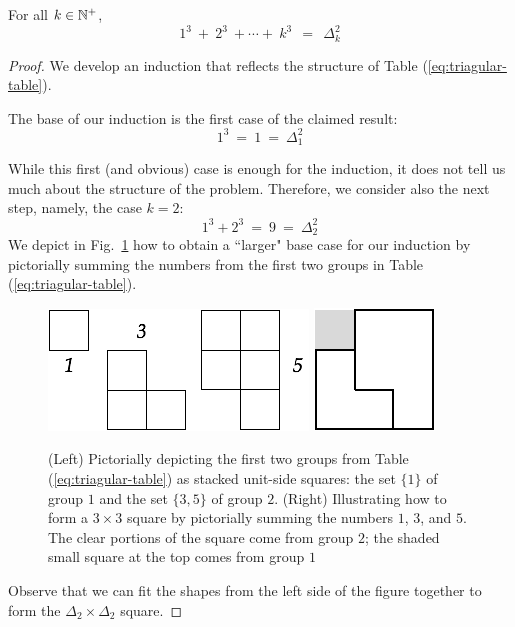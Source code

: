 \begin{prop}
\label{thm:cubes-sumto-Delta-saquared}
For all $k \in \mathbb{N}^+$,
\[ 1^3 \ + \ 2^3 \ + \cdots + \ k^3 \ \ = \ \ \Delta_k^2 \]
\end{prop}

\begin{proof}
We develop an induction that reflects the structure of Table (\ref{eq:triagular-table}).

\smallskip

The base of our induction is the first case of the claimed result:
\[  1^3 \  = \ 1 \ = \ \Delta_1^2 \]

While this first (and obvious) case is enough for the induction, it does not tell us much about the structure of the problem.  Therefore, we consider also the next step, namely, the case $k=2$:
\[  1^3 + 2^3 \ = \ 9 \ = \ \Delta_2^2 \]
We depict in Fig.~\ref{fig:sumCubes1} how to obtain a ``larger" base case for our induction by pictorially summing the numbers from the first two groups in Table (\ref{eq:triagular-table}).
\begin{figure}[hbt]
\begin{center}
       \includegraphics[scale=0.35]{FiguresMaths/SumCubes1} \hspace{2cm}
       \includegraphics[scale=0.35]{FiguresMaths/SumCubes1bis}
\caption{(Left) Pictorially depicting the first two groups from Table (\ref{eq:triagular-table}) as stacked unit-side squares: the set $\{1\}$ of group $1$ and the set $\{3, 5\}$ of group $2$. (Right) Illustrating how to form a $3 \times 3$ square by pictorially summing the numbers $1$, $3$, and $5$.  The clear portions of the square come from  group $2$; the shaded small square at the top comes from group $1$}
       \label{fig:sumCubes1}
\end{center}
\end{figure}
Observe that we can fit the shapes from the left side of the figure together to form the $\Delta_2 \times \Delta_2$ square.


\end{proof}
